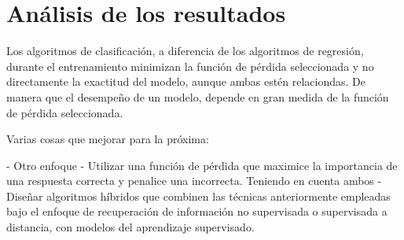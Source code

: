 \section{Análisis de los resultados}

Los algoritmos de clasificación, a diferencia de los algoritmos de regresión, durante el entrenamiento minimizan la función de pérdida seleccionada y no directamente la exactitud del modelo, aunque ambas estén relaciondas. De manera que el desempeño de un modelo, depende en gran medida de la función de pérdida seleccionada. 


Varias cosas que mejorar para la próxima:

- Otro enfoque
- Utilizar una función de pérdida que maximice la importancia de una respuesta correcta y penalice una incorrecta. Teniendo en cuenta ambos 
- Diseñar algoritmos híbridos que combinen las técnicas anteriormente empleadas bajo el enfoque de recuperación de información no supervisada o supervisada a distancia, con modelos del aprendizaje supervisado.



